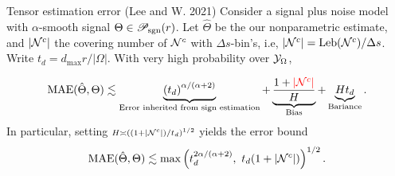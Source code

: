 \documentclass[10pt, mathserif]{beamer} %
\theoremstyle{definition}
\theoremstyle{plain}
\def\caliP{\mathscr{P}_{\textup{sgn}}}
\newcommand*{\KeepStyleUnderBrace}[1]{%
\mathop{%
\mathchoice
{\underbrace{\displaystyle#1}}%
{\underbrace{\textstyle#1}}%
{\underbrace{\scriptstyle#1}}%
{\underbrace{\scriptscriptstyle#1}}%
}\limits
}
\def\caliP{\mathscr{P}_{\textup{sgn}}}
\begin{document}
\begin{frame}

\begin{block}{Tensor estimation error (Lee and W. 2021)} Consider a signal plus noise model with $\alpha$-smooth signal $\Theta \in \caliP(r)$. Let $\hat \Theta$ be the our nonparametric estimate, and $|\mathcal{N}^c|$ the covering number of $\mathcal{N}^c$ with $\Delta s$-bin's, i.e, $|\mathcal{N}^c| = \text{Leb}(\mathcal{N}^c)/\Delta s$. Write $t_d={d_{\max}r /|\Omega|}$. With very high probability over $\mathcal{Y}_\Omega$, 

\begin{equation}\label{eq:bound2}
\textup{MAE}(\hat \Theta, \Theta)\lesssim \KeepStyleUnderBrace{\left(t_d\right)^{\alpha/(\alpha+2)}}_{\text{Error inherited from sign estimation}}+\KeepStyleUnderBrace{{1+{\color{red}|\tN^c|}\over H}}_{\text{Bias}}+\KeepStyleUnderBrace{Ht_d}_{\text{Bariance}}.
\end{equation}
In particular, setting $\scriptstyle H\asymp \left( (1+|\mathcal{N}^c|)/ t_d \right)^{1/2}$ yields the error bound
\begin{equation}\label{eq:real}
\textup{MAE}(\hat \Theta, \Theta)\lesssim \max\left(t_d^{{2\alpha/ (\alpha+2)} },\ t_d(1+|\mathcal{N}^c|)\right)^{1/2}.
\end{equation}
\end{block}
{\hfill \hyperlink{bound}{}}
\end{frame}
\end{document}
